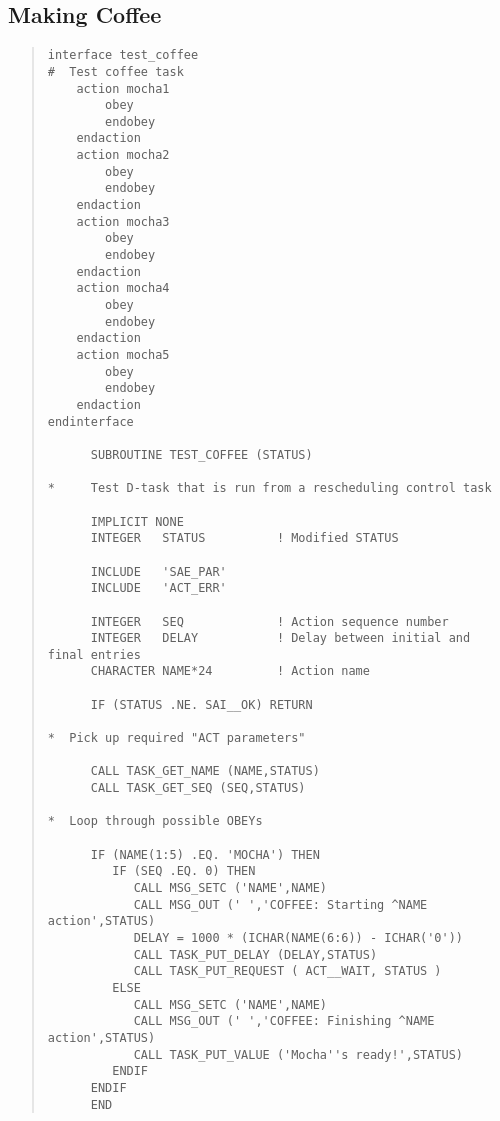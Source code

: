 \subsection{Making Coffee}
\small \begin{quote} \begin{verbatim}
interface test_coffee
#  Test coffee task
    action mocha1
        obey
        endobey
    endaction
    action mocha2
        obey
        endobey
    endaction
    action mocha3
        obey
        endobey
    endaction
    action mocha4
        obey
        endobey
    endaction
    action mocha5
        obey
        endobey
    endaction
endinterface

      SUBROUTINE TEST_COFFEE (STATUS)

*     Test D-task that is run from a rescheduling control task

      IMPLICIT NONE
      INTEGER   STATUS          ! Modified STATUS
 
      INCLUDE   'SAE_PAR'
      INCLUDE   'ACT_ERR'
 
      INTEGER   SEQ             ! Action sequence number
      INTEGER   DELAY           ! Delay between initial and final entries
      CHARACTER NAME*24         ! Action name
 
      IF (STATUS .NE. SAI__OK) RETURN

*  Pick up required "ACT parameters"

      CALL TASK_GET_NAME (NAME,STATUS)
      CALL TASK_GET_SEQ (SEQ,STATUS)

*  Loop through possible OBEYs
 
      IF (NAME(1:5) .EQ. 'MOCHA') THEN
         IF (SEQ .EQ. 0) THEN
            CALL MSG_SETC ('NAME',NAME)
            CALL MSG_OUT (' ','COFFEE: Starting ^NAME action',STATUS)
            DELAY = 1000 * (ICHAR(NAME(6:6)) - ICHAR('0'))
            CALL TASK_PUT_DELAY (DELAY,STATUS)
            CALL TASK_PUT_REQUEST ( ACT__WAIT, STATUS )
         ELSE
            CALL MSG_SETC ('NAME',NAME)
            CALL MSG_OUT (' ','COFFEE: Finishing ^NAME action',STATUS)
            CALL TASK_PUT_VALUE ('Mocha''s ready!',STATUS)
         ENDIF
      ENDIF
      END

\end{verbatim} \end{quote} \normalsize

